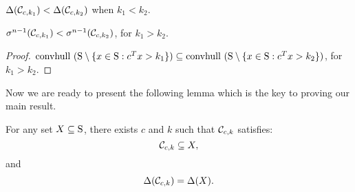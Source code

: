 \begin{corollary}\label{lemma:deltaMonotone}$\Delta(\mathcal{C}_{c,k_1}) < \Delta(\mathcal{C}_{c,k_2})$ when $k_1 < k_2$.
\end{corollary}

\begin{lemma}\label{lemma:muMonotone}$\sigma^{n-1}(\mathcal{C}_{c,k_1}) < \sigma^{n-1}(\mathcal{C}_{c,k_2})$, for $k_1 > k_2$.
\end{lemma}

\begin{proof}$\mbox{convhull }(\text{S} \setminus \{x\in \text{S}: c^Tx >k_1\}) \subseteq \mbox{convhull }(\text{S} \setminus \{x\in \text{S}: c^Tx >k_2\})$, for $k_1 > k_2$.
\end{proof}

Now we are ready to present the following lemma which is the key to proving our main result.
\begin{lemma}\label{lemma:constructSC}For any set $X \subseteq \text{S}$, there exists $c$ and $k$ such that $\mathcal{C}_{c,k}$ satisfies:
\begin{equation*}\mathcal{C}_{c,k} \subseteq X,
\end{equation*}
 and
\begin{equation}\Delta(\mathcal{C}_{c,k}) = \Delta(X).
\end{equation}
\end{lemma}

